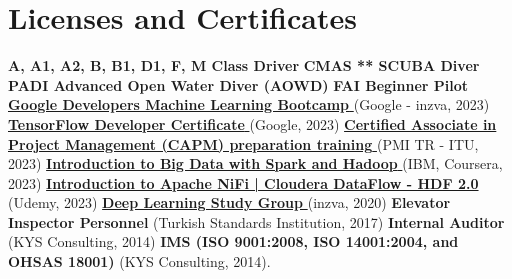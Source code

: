 \documentclass[a4paper,11pt]{article}
\begin{document}
\section{\textbf{Licenses and Certificates}}
\small
\justifying
\faPaperPlane  \enspace %
\textbf{A, A1, A2, B, B1, D1, F, M Class Driver} \enspace {\small\textbullet}  \enspace
\textbf{CMAS ** SCUBA Diver} \enspace {\small\textbullet}  \enspace
\textbf{PADI Advanced Open Water Diver (AOWD)} \enspace {\small\textbullet}  \enspace
\textbf{FAI Beginner Pilot} \enspace  \faPaperPlane \enspace %
\href{https://github.com/burakai/curriculum-vitae/blob/525370377ce16bdd13980e2b96d08e05ffca4966/papers/cert_2023_google-developers_ml_bootcamp.pdf}{\textbf{Google Developers Machine Learning Bootcamp} \faLink} (Google - inzva, 2023) \enspace {\small\textbullet} \enspace
\href{https://www.credential.net/78698ddb-f853-4163-9af0-e40f4d96717f\#gs.1yymvq}{\textbf{TensorFlow Developer Certificate} \faLink} (Google, 2023) \enspace {\small\textbullet} \enspace
\href{https://github.com/burakai/curriculum-vitae/blob/525370377ce16bdd13980e2b96d08e05ffca4966/papers/cert_2023_pmi-itu_capm.png}{\textbf{Certified Associate in Project Management (CAPM) preparation training} \faLink} (PMI TR - ITU, 2023) \enspace {\small\textbullet} \enspace
\href{https://coursera.org/share/da44f3f69bf49ddc780589dbe1deafd8}{\textbf{Introduction to Big Data with Spark and Hadoop} \faLink} (IBM, Coursera, 2023) \enspace {\small\textbullet} \enspace
\href{https://www.udemy.com/certificate/UC-f103e3b8-b3de-4776-a95f-a03c73fb5471/}{\textbf{Introduction to Apache NiFi | Cloudera DataFlow - HDF 2.0} \faLink} (Udemy, 2023) \enspace {\small\textbullet} \enspace
\href{https://github.com/burakai/curriculum-vitae/blob/525370377ce16bdd13980e2b96d08e05ffca4966/papers/cert_2020_inzva_deep-learning-study-group.pdf}{\textbf{Deep Learning Study Group} \faLink} (inzva, 2020) \enspace {\small\textbullet} \enspace
\textbf{Elevator Inspector Personnel} (Turkish Standards Institution, 2017) \enspace {\small\textbullet} \enspace
\textbf{Internal Auditor} (KYS Consulting, 2014) \enspace {\small\textbullet} \enspace
\textbf{IMS (ISO 9001:2008, ISO 14001:2004, and OHSAS 18001)} (KYS Consulting, 2014).





\end{document}
